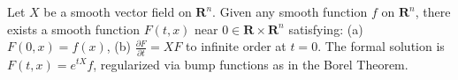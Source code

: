 Let $X$ be a smooth vector field on $\mathbf{R}^n$. Given any smooth function $f$ on $\mathbf{R}^n$, there exists a smooth function $F(t, x)$ near $0 \in \mathbf{R} \times \mathbf{R}^n$ satisfying:
(a) $F(0, x) = f(x)$,
(b) $\frac{\partial F}{\partial t} = XF$ to infinite order at $t = 0$.
The formal solution is $F(t, x) = e^{tX} f$, regularized via bump functions as in the Borel Theorem.
